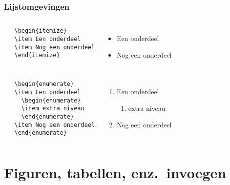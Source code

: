 \documentclass[aspectratio=169]{beamer}
\begin{document}
\begin{frame}[fragile]
 \frametitle{Lijstomgevingen}

 \begin{columns}[c]
   \begin{verbatim}
   \begin{itemize}
   \item Een onderdeel
   \item Nog een onderdeel
   \end{itemize}
   \end{verbatim}

   \begin{itemize}
     \item Een onderdeel
     \item Nog een onderdeel
   \end{itemize}
 \end{columns}

 \pause

 \begin{columns}[c]
   \begin{verbatim}
   \begin{enumerate}
   \item Een onderdeel
     \begin{enumerate}
     \item extra niveau
     \end{enumerate}
   \item Nog een onderdeel
   \end{enumerate}
   \end{verbatim}

   \begin{enumerate}
     \item Een onderdeel
     \begin{enumerate}
       \item extra niveau
     \end{enumerate}
     \item Nog een onderdeel
   \end{enumerate}
 \end{columns}

\end{frame}

\section{Figuren, tabellen, enz.\ invoegen}
\end{document}

